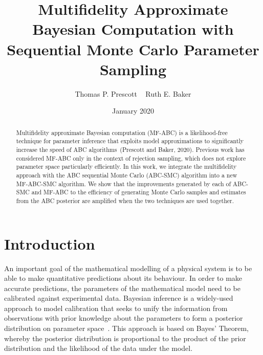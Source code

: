 \documentclass[12pt, onecolumn]{article}
\begin{document}
\title{Multifidelity Approximate Bayesian Computation with Sequential Monte Carlo Parameter Sampling}
\author{Thomas P. Prescott ~\quad{} Ruth E. Baker}
\date{January 2020}
\maketitle{}

\begin{abstract}
Multifidelity approximate Bayesian computation (MF-ABC) is a likelihood-free technique for parameter inference that exploits model approximations to significantly increase the speed of ABC algorithms~(Prescott and Baker, 2020).
Previous work has considered MF-ABC only in the context of rejection sampling, which does not explore parameter space particularly efficiently.
In this work, we integrate the multifidelity approach with the ABC sequential Monte Carlo (ABC-SMC) algorithm into a new MF-ABC-SMC algorithm.
We show that the improvements generated by each of ABC-SMC and MF-ABC to the efficiency of generating Monte Carlo samples and estimates from the ABC posterior are amplified when the two techniques are used together.
\end{abstract}

\section{Introduction}
\label{s:Intro}

An important goal of the mathematical modelling of a physical system is to be able to make quantitative predictions about its behaviour.
In order to make accurate predictions, the parameters of the mathematical model need to be calibrated against experimental data.
Bayesian inference is a widely-used approach to model calibration that seeks to unify the information from observations with prior knowledge about the parameters to form a posterior distribution on parameter space~\cite{Beaumont2010,Hines2015,Schnoerr2017}.
This approach is based on Bayes' Theorem, whereby the posterior distribution is proportional to the product of the prior distribution and the likelihood of the data under the model.
\end{document}
